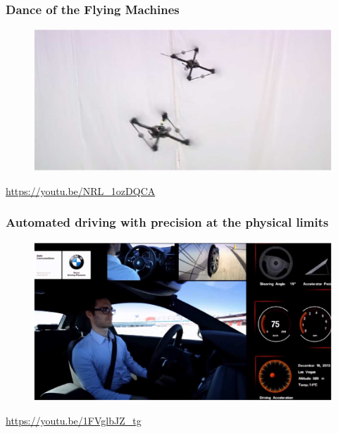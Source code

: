 \documentclass{beamer}
\begin{document}
\begin{frame}
\frametitle{Dance of the Flying Machines}
\begin{figure}
\includegraphics[scale=0.4]{flying_machines}
\end{figure}
\url{https://youtu.be/NRL_1ozDQCA}
\end{frame}


\begin{frame}
\frametitle{Automated driving with precision at the physical limits}
\begin{figure}
\includegraphics[scale=0.28]{autonomous_car}
\end{figure}
\url{https://youtu.be/1FVglbJZ_tg}
\end{frame}

\end{document}

